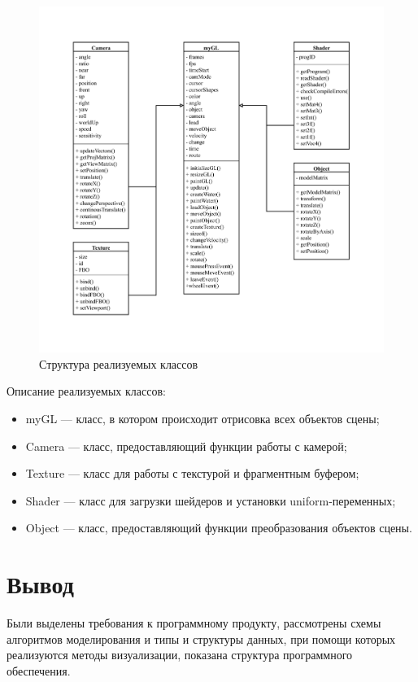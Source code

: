 \begin{figure}[H]
	\begin{center}
		\includegraphics[scale=0.6]{img/software-struct.pdf}
	\end{center}
	\captionsetup{justification=centering}
	\caption{Структура реализуемых классов}
	\label{img:software-struct}
\end{figure}

Описание реализуемых классов:

\begin{itemize}
	\item myGL --- класс, в котором происходит отрисовка всех объектов сцены;
	\item Camera --- класс, предоставляющий функции работы с камерой;
	\item Texture --- класс для работы с текстурой и фрагментным буфером;
	\item Shader --- класс для загрузки шейдеров и установки uniform-переменных;
	\item Object --- класс, предоставляющий функции преобразования объектов сцены.
\end{itemize}

\section*{Вывод}

Были выделены требования к программному продукту, рассмотрены схемы алгоритмов моделирования и типы и структуры данных, при помощи которых реализуются методы визуализации, показана структура программного обеспечения.